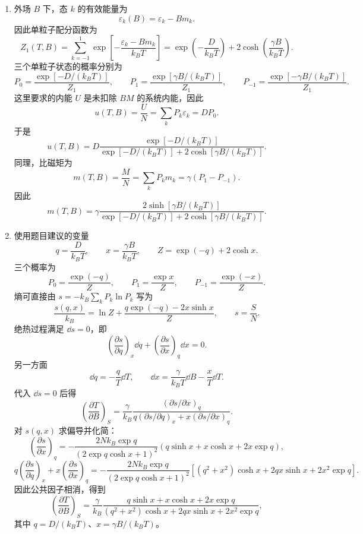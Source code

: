 \begin{question}[25 分]
\begin{solution}
\begin{enumerate}
    \item 外场 $B$ 下，态 $k$ 的有效能量为
    \[
        \varepsilon_k(B)=\varepsilon_k-Bm_k.
    \]
    因此单粒子配分函数为
    \[
        Z_1(T,B)=\sum_{k=-1}^{1}\exp\left[-\frac{\varepsilon_k-Bm_k}{k_BT}\right]
        =\exp\left(-\frac{D}{k_BT}\right)+2\cosh\left(\frac{\gamma B}{k_BT}\right).
    \]
    三个单粒子状态的概率分别为
    \[
        P_0=\frac{\exp[-D/(k_BT)]}{Z_1},
        \qquad
        P_1=\frac{\exp[\gamma B/(k_BT)]}{Z_1},
        \qquad
        P_{-1}=\frac{\exp[-\gamma B/(k_BT)]}{Z_1}.
    \]
    这里要求的内能 $U$ 是未扣除 $BM$ 的系统内能，因此
    \[
        u(T,B)=\frac{U}{N}=\sum_kP_k\varepsilon_k=DP_0.
    \]
    于是
    \[
        \boxed{
        u(T,B)=D\frac{\exp[-D/(k_BT)]}{\exp[-D/(k_BT)]+2\cosh[\gamma B/(k_BT)]}.}
    \]
    同理，比磁矩为
    \[
        m(T,B)=\frac{M}{N}=\sum_kP_km_k=\gamma(P_1-P_{-1}).
    \]
    因此
    \[
        \boxed{
        m(T,B)=\gamma\frac{2\sinh[\gamma B/(k_BT)]}{\exp[-D/(k_BT)]+2\cosh[\gamma B/(k_BT)]}.}
    \]

    \item 使用题目建议的变量
    \[
        q=\frac{D}{k_BT},
        \qquad
        x=\frac{\gamma B}{k_BT},
        \qquad
        Z=\exp(-q)+2\cosh x.
    \]
    三个概率为
    \[
        P_0=\frac{\exp(-q)}{Z},
        \qquad
        P_1=\frac{\exp x}{Z},
        \qquad
        P_{-1}=\frac{\exp(-x)}{Z}.
    \]
    熵可直接由 $s=-k_B\sum_kP_k\ln P_k$ 写为
    \[
        \frac{s(q,x)}{k_B}=\ln Z+\frac{q\exp(-q)-2x\sinh x}{Z},
        \qquad s=\frac{S}{N}.
    \]
    绝热过程满足 $\dd{s}=0$，即
    \[
        \left(\frac{\partial s}{\partial q}\right)_x\dd{q}
        +\left(\frac{\partial s}{\partial x}\right)_q\dd{x}=0.
    \]
    另一方面
    \[
        \dd q=-\frac{q}{T}\dd T,
        \qquad
        \dd x=\frac{\gamma}{k_BT}\dd B-\frac{x}{T}\dd T.
    \]
    代入 $\dd{s}=0$ 后得
    \[
        \left(\frac{\partial T}{\partial B}\right)_S
        =\frac{\gamma}{k_B}
        \frac{(\partial s/\partial x)_q}{q(\partial s/\partial q)_x+x(\partial s/\partial x)_q}.
    \]
    对 $s(q,x)$ 求偏导并化简：
    \[
        \left(\frac{\partial s}{\partial x}\right)_q
        =-\frac{2Nk_B\exp q}{(2\exp q\cosh x+1)^2}
        \left(q\sinh x+x\cosh x+2x\exp q\right),
    \]
    \[
        q\left(\frac{\partial s}{\partial q}\right)_x+x\left(\frac{\partial s}{\partial x}\right)_q
        =-\frac{2Nk_B\exp q}{(2\exp q\cosh x+1)^2}
        \left[(q^2+x^2)\cosh x+2qx\sinh x+2x^2\exp q\right].
    \]
    因此公共因子相消，得到
    \[
        \boxed{
        \left(\frac{\partial T}{\partial B}\right)_S
        =\frac{\gamma}{k_B}
        \frac{q\sinh x+x\cosh x+2x\exp q}
        {(q^2+x^2)\cosh x+2qx\sinh x+2x^2\exp q},}
    \]
    其中 $q=D/(k_BT)$、$x=\gamma B/(k_BT)$。
\end{enumerate}
\end{solution}
\end{question}
